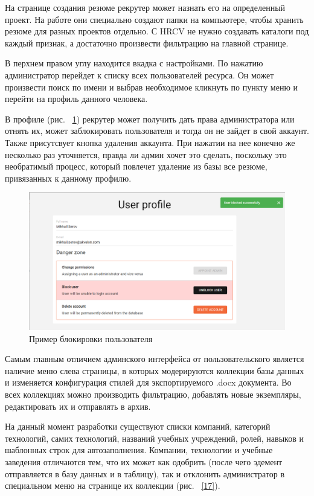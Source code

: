 \documentclass[a4paper,12pt]{diplom}
\begin{document}
На странице создания резюме рекрутер может назнать его на определенный проект. На работе они специально создают папки на компьютере, чтобы хранить резюме для разных проектов отдельно. С HRCV не нужно создавать каталоги под каждый признак, а достаточно произвести фильтрацию на главной странице.

В перхнем правом углу находится вкадка с настройками. По нажатию администратор перейдет к списку всех пользователей ресурса. Он может произвести поиск по имени и выбрав необходимое кликнуть по пункту меню и перейти на профиль данного человека.

В профиле (рис. ~\ref{16}) рекрутер может получить дать права администратора или отнять их, может заблокировать пользователя и тогда он не зайдет в свой аккаунт.
Также присутсвует кнопка удаления аккаунта. При нажатии на нее конечно же несколько раз уточняется, правда ли админ хочет это сделать, поскольку это необратимый процесс, который повлечет удаление из базы все резюме, привязанных к данному профилю.


\begin{figure}[!ht]
	\centering
	\includegraphics[width=1\textwidth]{resources/dangerzone.png}
	\caption{Пример блокировки пользователя}
	\label{16}
\end{figure}

Самым главным отличием админского интерфейса от пользовательского является наличие меню слева страницы, в которых модерируются коллекции 
базы данных и изменяется конфигурация стилей для экспортируемого .docx документа. Во всех коллекциях можно производить фильтрацию, добавлять новые экземпляры, редактировать их и отправлять в архив.

На данный момент разработки существуют списки компаний, категорий технологий, самих технологий, названий учебных учреждений, ролей, навыков и шаблонных строк для автозаполнения. Компании, технологии и учебные заведения отличаются тем, что их может как одобрить (после чего эдемент отправляется в базу данных и в таблицу), так и отклонить администратор в 
специальном меню на странице их коллекции (рис. ~\ref{17}).
\end{document}
